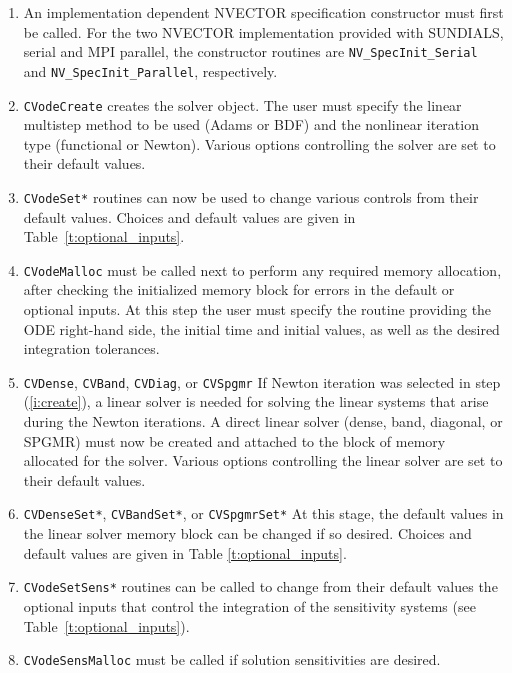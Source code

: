 \begin{enumerate}
\item \label{i:nvspec}
  An implementation dependent NVECTOR specification constructor must first
  be called. For the two NVECTOR implementation provided with SUNDIALS, serial
  and MPI parallel, the constructor routines are {\tt NV\_SpecInit\_Serial}
  and {\tt NV\_SpecInit\_Parallel}, respectively.
\item \label{i:create}
  {\tt CVodeCreate} 
  creates the solver object.
  The user must specify the linear multistep method to be used 
  (Adams or BDF) and the nonlinear iteration type (functional or Newton).
  Various options controlling the solver are set to their default values.
\item \label{i:set}
  {\tt CVodeSet*} 
  routines can now be used to change various controls from their default values.
  Choices and default values are given in Table~\ref{t:optional_inputs}.
\item \label{i:malloc}
  {\tt CVodeMalloc}
  must be called next to perform any required memory allocation, after checking 
  the initialized memory block for errors in the default or optional inputs. 
  At this step the user must specify the routine providing the ODE right-hand 
  side, the initial time and initial values, as well as the desired
  integration tolerances.
\item \label{i:linear}
  {\tt CVDense}, {\tt CVBand}, {\tt CVDiag}, or {\tt CVSpgmr}
  If Newton iteration was selected in step (\ref{i:create}), a linear solver  
  is needed for solving the linear systems that arise during the Newton iterations. 
  A direct linear solver (dense, band, diagonal, or SPGMR) must now be created
  and attached to the block of memory allocated for the solver.
  Various options controlling the linear solver are set to their default values.
\item \label{i:ls_set}
  {\tt CVDenseSet*}, {\tt CVBandSet*}, or {\tt CVSpgmrSet*}
  At this stage, the default values in the linear solver memory block can be
  changed if so desired. 
  Choices and default values are given in Table \ref{t:optional_inputs}.
\item \label{i:sensi_set}
  {\tt CVodeSetSens*}
  routines can be called to change from their default values the optional inputs
  that control the integration of the sensitivity systems 
  (see Table~\ref{t:optional_inputs}).
\item \label{i:sensi_malloc} 
  {\tt CVodeSensMalloc}
  must be called if solution sensitivities are desired.

\end{enumerate}
